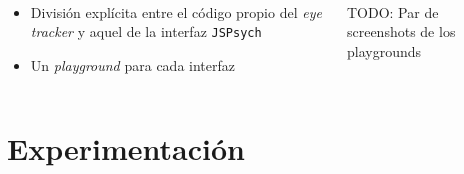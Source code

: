\documentclass[aspectratio=169]{beamer}
\begin{document}
\begin{frame}{~}
  \begin{columns}
    \begin{column}{.5\textwidth}
      \begin{itemize}
        \item División explícita entre el código propio del \textit{eye
          tracker} y aquel de la interfaz \texttt{JSPsych}

        \item Un \textit{playground} para cada interfaz
      \end{itemize}
    \end{column}

    \begin{column}{.5\textwidth}
      TODO: Par de screenshots de los playgrounds
    \end{column}
  \end{columns}

\end{frame}

\section{Experimentación}
\end{document}
